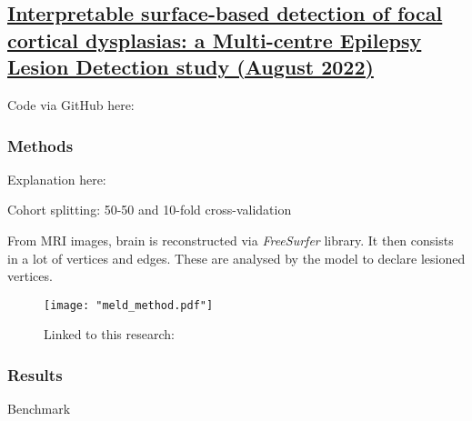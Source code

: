 \subsection{\href{https://academic.oup.com/brain/article/145/11/3859/6659752?login=true}{Interpretable surface-based detection of focal cortical dysplasias: a Multi-centre Epilepsy Lesion Detection study (August 2022)}}
\label{sub:sec:meld_research}

Code via GitHub here: 

\subsubsection{Methods}

Explanation here: 

Cohort splitting: 50-50 and 10-fold cross-validation

From MRI images, brain is reconstructed via \emph{FreeSurfer} library. It then consists in a lot of vertices and edges.
These are analysed by the model to declare lesioned vertices.

\begin{figure}[htbp]
	\centering
	\texttt{[image: "meld\_method.pdf"]}
	\caption{Linked to this research: }%
	\label{fig:meld_explanation}
\end{figure}

\subsubsection{Results}

\begin{table}[htbp]
	\centering
	\caption{Benchmark}

	\caption{Results}
\end{table}

